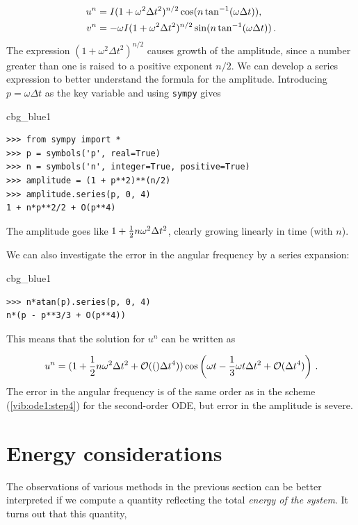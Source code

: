 \documentclass[%
oneside,                 %
final,                   %
10pt]{article}
\newenvironment{_cod_tight}[1]{
   \def\FrameCommand{\colorbox{#1}}
   \FrameRule0.6pt\MakeFramed {\FrameRestore}\vskip3mm}
   {\vskip0mm\endMakeFramed}
\newenvironment{cod}[1]{
\bgroup\rmfamily
\fboxsep=0mm\relax
\begin{_cod_tight}{#1}
\list{}{\parsep=-2mm\parskip=0mm\topsep=0pt\leftmargin=2mm
\rightmargin=2\leftmargin\leftmargin=4pt\relax}
\item\relax}
{\endlist\end{_cod_tight}\egroup}
\begin{document}
\begin{align}
u^n & =
I(1+\omega^2\Delta t^2)^{n/2}\cos (n\tan^{-1}(\omega\Delta t)),\\ 
v^n &=- \omega
I(1+\omega^2\Delta t^2)^{n/2}\sin (n\tan^{-1}(\omega\Delta t))\tp
\end{align}
The expression $(1+\omega^2\Delta t^2)^{n/2}$ causes growth of
the amplitude, since a number greater than one is raised to a positive
exponent $n/2$. We can develop a series expression to better understand
the formula for the amplitude. Introducing $p=\omega\Delta t$ as the
key variable and using \texttt{sympy} gives

\begin{cod}{cbg_blue1}\begin{Verbatim}[numbers=none,fontsize=\fontsize{9pt}{9pt},baselinestretch=0.95,xleftmargin=2mm]
>>> from sympy import *
>>> p = symbols('p', real=True)
>>> n = symbols('n', integer=True, positive=True)
>>> amplitude = (1 + p**2)**(n/2)
>>> amplitude.series(p, 0, 4)
1 + n*p**2/2 + O(p**4)
\end{Verbatim}
\end{cod}
\noindent
The amplitude goes like $1 + \half n\omega^2\Delta t^2$, clearly growing
linearly in time (with $n$).

We can also investigate the error in the angular frequency by a
series expansion:

\begin{cod}{cbg_blue1}\begin{Verbatim}[numbers=none,fontsize=\fontsize{9pt}{9pt},baselinestretch=0.95,xleftmargin=2mm]
>>> n*atan(p).series(p, 0, 4)
n*(p - p**3/3 + O(p**4))
\end{Verbatim}
\end{cod}
\noindent
This means that the solution for $u^n$ can be written as

\[ u^n = (1 + \half n\omega^2\Delta t^2 + \Oof(\Delta t^4))
\cos\left(\omega t - \frac{1}{3}\omega t\Delta t^2 + \Oof{\Delta t^4}\right)
\tp\]
The error in the angular frequency is of the same order as in the
scheme (\ref{vib:ode1:step4}) for the second-order ODE, but error
in the amplitude is severe.


\section{Energy considerations}
\label{vib:model1:energy}

 

The observations of various methods in the previous section can be
better interpreted if we compute a quantity reflecting
the total \emph{energy of the system}. It turns out that this quantity,
\end{document}
